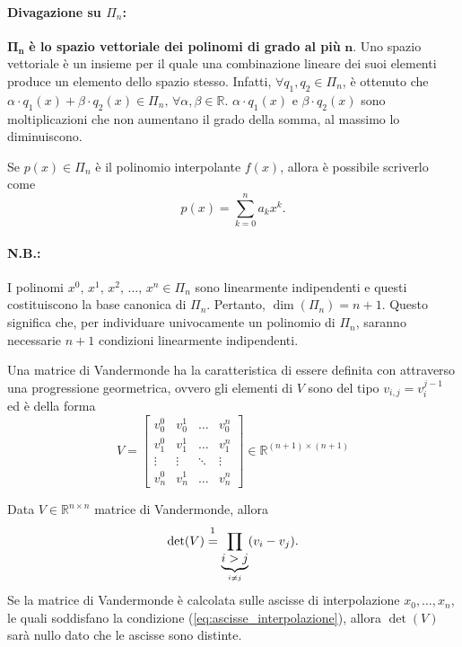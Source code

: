 \paragraph{Divagazione su $\Pi_n$:}{
$\boldsymbol{\Pi_n}$ \textbf{è lo spazio vettoriale dei polinomi di grado al più} $\boldsymbol n$. Uno spazio vettoriale è un insieme per il quale una combinazione lineare dei suoi elementi produce un elemento dello spazio stesso.
Infatti, $\forall q_1, q_2\in\Pi_n$, è ottenuto che $\alpha \cdot q_1(x)+\beta\cdot q_2(x)\in\Pi_n,\, \forall \alpha,\beta\in\mathbb R$. $\alpha \cdot q_1(x)$ e $\beta\cdot q_2(x)$ sono moltiplicazioni che non aumentano il grado della somma, al massimo lo diminuiscono.

Se $p(x)\in\Pi_n$ è il polinomio interpolante $f(x)$, allora è possibile scriverlo come
\begin{equation}\label{eq:polinomio_generico}
    p(x)=\sum_{k=0}^{n}a_kx^k.
\end{equation}

\paragraph{N.B.:} I polinomi $x^0,\, x^1,\, x^2,\, \hdots,\, x^n\in\Pi_n$ sono linearmente indipendenti e questi costituiscono la base canonica di $\Pi_n$. Pertanto, $\dim(\Pi_n)=n+1$. Questo significa che, per individuare univocamente un polinomio di $\Pi_n$,  saranno necessarie $n+1$ condizioni linearmente indipendenti.}

 \begin{definition}
	Una matrice di Vandermonde ha la caratteristica di essere definita con attraverso una progressione geormetrica, ovvero gli elementi di $V$ sono del tipo $v_{i,j}=v_i^{j-1}$ ed è della forma
	 \begin{equation*}
	 	V=\begin{bmatrix}
	 		v_0^0 & v_0^1 & \hdots & v_0^n\\
	 		v_1^0 & v_1^1 & \hdots & v_1^n\\
	 		\vdots & \vdots &\ddots & \vdots\\
	 		v_n^0 & v_n^1 & \hdots & v_n^n
	 	\end{bmatrix}\in\mathbb R^{(n+1)\times (n+1)}
	 \end{equation*}
\end{definition}

\begin{property}\label{prop:determinante_matrice_vandermonde}
	Data $V\in\mathbb{R}^{n\times n}$ matrice di Vandermonde, allora
	\begin{equation}\label{eq:determinante_matrice_vandermonde}
		\det(V)\overset{\footnotemark}{=}\prod_{\underbrace{i>j}_{i\neq j}}(v_i-v_j).
	\end{equation}
	Se la matrice di Vandermonde è calcolata sulle ascisse di interpolazione $x_0, \hdots, x_n$, le quali soddisfano la condizione (\ref{eq:ascisse_interpolazione}), allora $\det(V)$ sarà nullo dato che le ascisse sono distinte.
\end{property}

